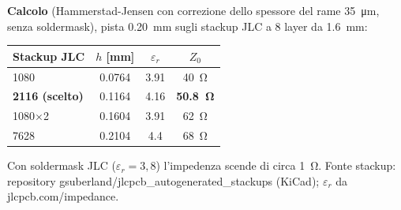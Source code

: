 \textbf{Calcolo} (Hammerstad-Jensen con correzione dello spessore del rame \SI{35}{\micro\metre}, senza soldermask), pista \SI{0,20}{\milli\metre} sugli stackup JLC a 8 layer da \SI{1,6}{\milli\metre}:
\begin{center}
\begin{tabular}{@{}lccc@{}}
\toprule
Stackup JLC & $h$ [\si{\milli\metre}] & $\varepsilon_r$ & $Z_0$\\
\midrule
1080 & \num{0,0764} & \num{3,91} & \SI{40}{\ohm}\\
\textbf{2116 (scelto)} & \num{0,1164} & \num{4,16} & \textbf{\SI{50,8}{\ohm}}\\
1080$\times$2 & \num{0,1604} & \num{3,91} & \SI{62}{\ohm}\\
7628 & \num{0,2104} & \num{4,4} & \SI{68}{\ohm}\\
\bottomrule
\end{tabular}
\end{center}
Con soldermask JLC ($\varepsilon_r=3{,}8$) l'impedenza scende di circa \SI{1}{\ohm}. Fonte stackup: repository gsuberland/jlcpcb\_autogenerated\_stackups (KiCad); $\varepsilon_r$ da jlcpcb.com/impedance.

